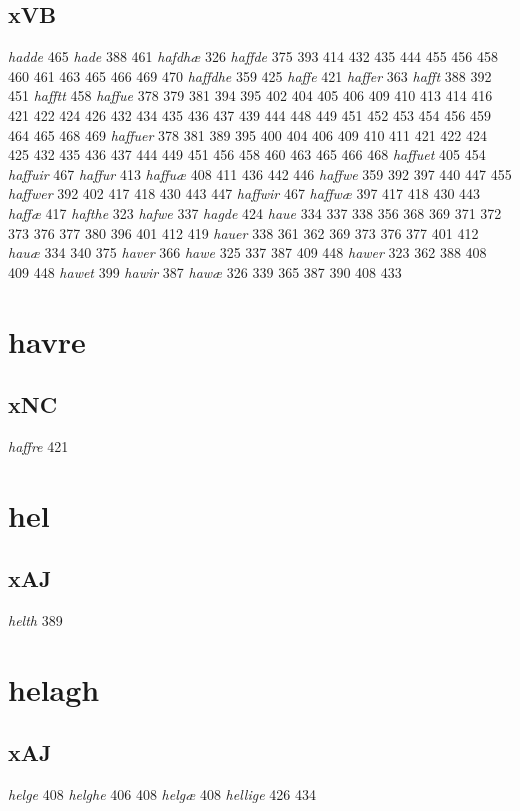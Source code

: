 \documentclass[a4paper,twocolumn]{article}
\begin{document}
\subsection{xVB}
\label{sec:org2cb9e92}
\emph{hadde} 465 \emph{hade} 388 461 \emph{hafdhæ} 326 \emph{haffde} 375 393 414 432 435 444 455 456 458 460 461 463 465 466 469 470 \emph{haffdhe} 359 425 \emph{haffe} 421 \emph{haffer} 363 \emph{hafft} 388 392 451 \emph{hafftt} 458 \emph{haffue} 378 379 381 394 395 402 404 405 406 409 410 413 414 416 421 422 424 426 432 434 435 436 437 439 444 448 449 451 452 453 454 456 459 464 465 468 469 \emph{haffuer} 378 381 389 395 400 404 406 409 410 411 421 422 424 425 432 435 436 437 444 449 451 456 458 460 463 465 466 468 \emph{haffuet} 405 454 \emph{haffuir} 467 \emph{haffur} 413 \emph{haffuæ} 408 411 436 442 446 \emph{haffwe} 359 392 397 440 447 455 \emph{haffwer} 392 402 417 418 430 443 447 \emph{haffwir} 467 \emph{haffwæ} 397 417 418 430 443 \emph{haffæ} 417 \emph{hafthe} 323 \emph{hafwe} 337 \emph{hagde} 424 \emph{haue} 334 337 338 356 368 369 371 372 373 376 377 380 396 401 412 419 \emph{hauer} 338 361 362 369 373 376 377 401 412 \emph{hauæ} 334 340 375 \emph{haver} 366 \emph{hawe} 325 337 387 409 448 \emph{hawer} 323 362 388 408 409 448 \emph{hawet} 399 \emph{hawir} 387 \emph{hawæ} 326 339 365 387 390 408 433 
\section{havre}
\label{sec:org0020768}
\subsection{xNC}
\label{sec:org506aeb5}
\emph{haffre} 421 
\section{hel}
\label{sec:org209b67f}
\subsection{xAJ}
\label{sec:org794c9d2}
\emph{helth} 389 
\section{helagh}
\label{sec:org98be460}
\subsection{xAJ}
\label{sec:orgdfaf8f6}
\emph{helge} 408 \emph{helghe} 406 408 \emph{helgæ} 408 \emph{hellige} 426 434 
\end{document}
